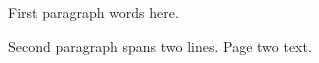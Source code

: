 \documentclass{article}
\begin{document}
First paragraph words here.

Second paragraph
spans two lines.
\newpage
Page two text.
\end{document}
